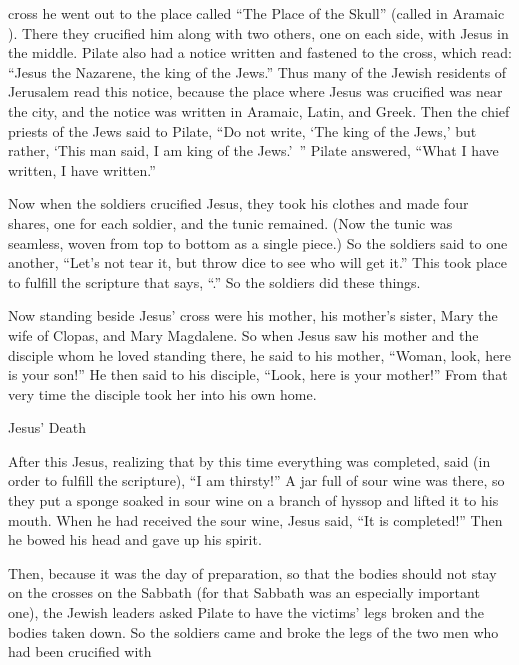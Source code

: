 {cross
he went out
to
the place called
“The Place
of
the Skull”
(called
in Aramaic
{}).
There
they crucified
him
along
with
two
others,
one on each side,
with Jesus
in the middle.
Pilate
also
had
a notice
written
and
fastened
to
the cross,
which read: “Jesus
the Nazarene,
the king
of the Jews.”
Thus
many
of the Jewish
residents of Jerusalem read
this notice, because
the place
where
Jesus
was crucified
was
near
the city,
and
the notice was written
in Aramaic,
Latin,
and Greek.
Then
the chief priests
of the Jews
said
to Pilate,
“Do
not
write,
‘The king
of the Jews,’
but
rather, ‘This man
said,
I am
king
of the Jews.’ ”
Pilate
answered,
“What
I have written,
I have written.”
\par }{\PP {}Now
when
the soldiers
crucified
Jesus,
they took
his
clothes
and
made
four
shares,
one for each
soldier,
and
the tunic
remained. (Now
the tunic
was seamless,
woven from
top
to bottom as
a single piece.)
So
the soldiers said
to
one another,
“Let’s
not
tear
it,
but
throw dice
to see who
will get it.”
This took place to fulfill
the scripture
that says, “{}.” So
the soldiers
did
these things.
\par }{\PP {}Now
standing
beside
Jesus’
cross
were his
mother,
his
mother’s
sister,
Mary
the wife of Clopas,
and
Mary
Magdalene.
So
when Jesus
saw
his mother
and
the disciple
whom
he loved
standing
there, he said
to his mother,
“Woman,
look,
here is your
son!”
He
then
said
to his disciple,
“Look,
here is your
mother!” From
that
very time
the disciple
took
her
into
his own home.
\par }{\SH Jesus’ Death
\par }{\PP {}After
this
Jesus,
realizing
that
by this time
everything
was completed,
said
(in order
to fulfill
the scripture), “I am thirsty!”
A jar
full
of sour wine
was there, so they put a sponge
soaked
in sour wine
on a branch of hyssop
and lifted it to his
mouth.
When
he had received
the sour wine,
Jesus
said,
“It is completed!” Then
he bowed
his head
and gave up
his spirit.
\par }{\PP {}Then,
because
it was
the day of preparation,
so that
the bodies
should
not
stay
on
the
crosses
on
the
Sabbath
(for
that
Sabbath
was
an especially important
one), the Jewish leaders asked
Pilate
to have
the victims’
legs
broken
and
the bodies taken down.
So
the soldiers
came
and
broke
the legs
of the two men who had been crucified with
}
